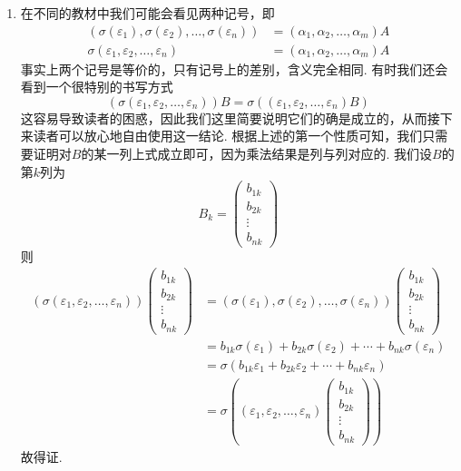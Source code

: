 \begin{enumerate}
    \item 在不同的教材中我们可能会看见两种记号，即
          \begin{align*}
              (\sigma(\varepsilon_1),\sigma(\varepsilon_2),\ldots,\sigma(\varepsilon_n))
              & =(\alpha_1,\alpha_2,\ldots,\alpha_m)A \\
              \sigma(\varepsilon_1,\varepsilon_2,\ldots,\varepsilon_n)
              & =(\alpha_1,\alpha_2,\ldots,\alpha_m)A
          \end{align*}
          事实上两个记号是等价的，只有记号上的差别，含义完全相同. 有时我们还会看到一个很特别的书写方式
          \[
            (\sigma(\varepsilon_1,\varepsilon_2,\ldots,\varepsilon_n))B
            =\sigma((\varepsilon_1,\varepsilon_2,\ldots,\varepsilon_n)B)
          \]
          这容易导致读者的困惑，因此我们这里简要说明它们的确是成立的，从而接下来读者可以放心地自由使用这一结论. 根据上述的第一个性质可知，我们只需要证明对$B$的某一列上式成立即可，因为乘法结果是列与列对应的. 我们设$B$的第$k$列为
          \[B_k=\begin{pmatrix}
                  b_{1k} \\ b_{2k} \\ \vdots \\ b_{nk}
              \end{pmatrix}\]
          则
          \begin{align*}
              (\sigma(\varepsilon_1,\varepsilon_2,\ldots,\varepsilon_n))
              \begin{pmatrix}
                  b_{1k} \\ b_{2k} \\ \vdots \\ b_{nk}
              \end{pmatrix}
               & =(\sigma(\varepsilon_1),\sigma(\varepsilon_2),\ldots,\sigma(\varepsilon_n))\begin{pmatrix}
                                                                                                b_{1k} \\ b_{2k} \\ \vdots \\ b_{nk}
                                                                                            \end{pmatrix} \\
               & =b_{1k}\sigma(\varepsilon_1)+b_{2k}\sigma(\varepsilon_2)+\cdots+b_{nk}\sigma(\varepsilon_n)                    \\
               & =\sigma(b_{1k}\varepsilon_1+b_{2k}\varepsilon_2+\cdots+b_{nk}\varepsilon_n)                                    \\
               & =\sigma((\varepsilon_1,\varepsilon_2,\ldots,\varepsilon_n)
              \begin{pmatrix}
                  b_{1k} \\ b_{2k} \\ \vdots \\ b_{nk}
              \end{pmatrix})
          \end{align*}
          故得证.
\end{enumerate}


